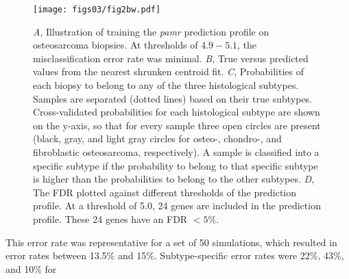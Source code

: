 \begin{figure}[htbp]
	\centering
	\texttt{[image: figs03/fig2bw.pdf]}	%
	\caption{{\it A}, Illustration of training the {\it pamr} prediction profile on osteosarcoma biopsies. At thresholds of $4.9-5.1$, the misclassification error rate was minimal. {\it B}, True versus predicted values from the nearest shrunken centroid fit. {\it C}, Probabilities of each biopsy to belong to any of the three histological subtypes. Samples are separated (dotted lines) based on their true subtypes. Cross\hyp{}validated probabilities for each histological subtype are shown on the y-axis, so that for every sample three open circles are present (black, gray, and light gray circles for \mbox{osteo-,} chondro-, and fibroblastic osteosarcoma, respectively). A sample is classified into a specific subtype if the probability to belong to that specific subtype is higher than the probabilities to belong to the other subtypes. {\it D}, The FDR plotted against different thresholds of the prediction profile. At a threshold of 5.0, 24 genes are included in the prediction profile. These 24 genes have an FDR $< 5\%$.} %
	\label{fig3.2}
\end{figure}
%
This error
rate was representative for a set of 50 simulations,
which resulted in error rates between 13.5\% and 15\%.
Subtype\hyp{}specific error rates were 22\%, 43\%, and 10\% for

